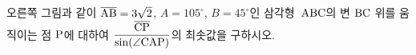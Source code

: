 \noindent\begin{minipage}[t]{0.58\linewidth}\vspace{0pt}\raggedright 오른쪽 그림과 같이 $\overline{\mathrm{AB}}=3\sqrt{2}$, $A=105^\circ$, $B=45^\circ$인 삼각형~$\mathrm{ABC}$의 변 $\mathrm{BC}$ 위를 움직이는 점 $\mathrm{P}$에 대하여 $\dfrac{\overline{\mathrm{CP}}}{\sin(\angle\mathrm{CAP})}$의 최솟값을 구하시오.\end{minipage}\hfill\begin{minipage}[t]{0.4\linewidth}\vspace{0pt}\centering \resizebox{\ifdim\width>\linewidth\linewidth\else\width\fi}{!}{}\end{minipage}\par
